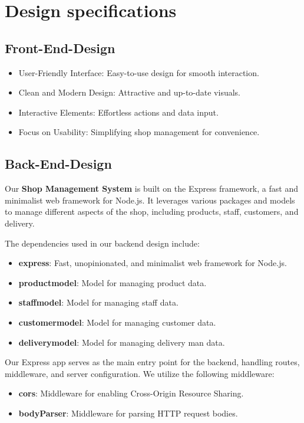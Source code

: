 \chapter{Design specifications}
\section{Front-End-Design}
\begin{itemize}
\item User-Friendly Interface: Easy-to-use design for smooth interaction.
\item Clean and Modern Design: Attractive and up-to-date visuals.
\item Interactive Elements: Effortless actions and data input.
\item Focus on Usability: Simplifying shop management for convenience.
\end{itemize}

\section{Back-End-Design}
Our \textbf{Shop Management System} is built on the Express framework, a fast and minimalist web framework for Node.js. It leverages various packages and models to manage different aspects of the shop, including products, staff, customers, and delivery.

The dependencies used in our backend design include:
\begin{itemize}
    \item \textbf{express}: Fast, unopinionated, and minimalist web framework for Node.js.
    \item \textbf{productmodel}: Model for managing product data.
    \item \textbf{staffmodel}: Model for managing staff data.
    \item \textbf{customermodel}: Model for managing customer data.
    \item \textbf{deliverymodel}: Model for managing delivery man data.
\end{itemize}
Our Express app serves as the main entry point for the backend, handling routes, middleware, and server configuration. We utilize the following middleware:
\begin{itemize}
    \item \textbf{cors}: Middleware for enabling Cross-Origin Resource Sharing.
    \item \textbf{bodyParser}: Middleware for parsing HTTP request bodies.
\end{itemize}

